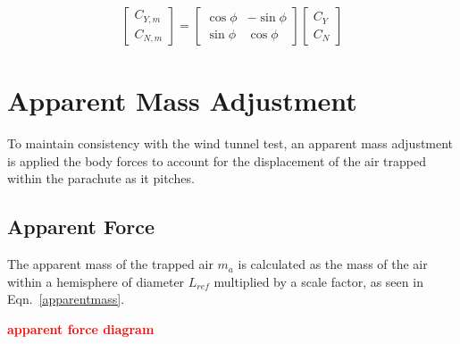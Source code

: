 \documentclass[]{aiaa-tc}%
\begin{document}
\begin{equation} \label{missilerotation}
\begin{split}
  \begin{bmatrix}
  {C_{Y,m}} \\
  {C_{N,m}}
  \end{bmatrix}
  =
  \begin{bmatrix}
  {\cos\phi} & {-\sin\phi} \\
  {\sin\phi} & { \cos\phi}
  \end{bmatrix}
  \begin{bmatrix}
  {C_Y} \\
  {C_N}
  \end{bmatrix}
\end{split}
\end{equation}


% 

\section{Apparent Mass Adjustment} \label{appmass} %

To maintain consistency with the wind tunnel test, an apparent mass adjustment is applied the body forces to account for the displacement of the air trapped within the parachute as it pitches.

\subsection{Apparent Force}

The apparent mass of the trapped air $m_a$ is calculated as the mass of the air within a hemisphere of diameter $L_{ref}$ multiplied by a scale factor, as seen in Eqn.~\ref{apparentmass}.

\textcolor{red}{\textbf{apparent force diagram}}
\end{document}

